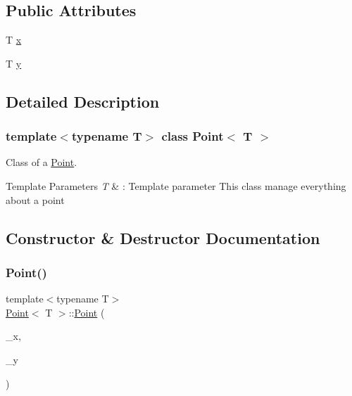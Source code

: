 \subsection*{Public Attributes}
\begin{DoxyCompactItemize}
\item 
T \hyperlink{classPoint_a401d07562afaf0079121218025e66b76}{x}
\item 
T \hyperlink{classPoint_a65146418a33ebb2cd9acb85cade60ac9}{y}
\end{DoxyCompactItemize}


\subsection{Detailed Description}
\subsubsection*{template$<$typename T$>$\newline
class Point$<$ T $>$}

Class of a \hyperlink{classPoint}{Point}. 


\begin{DoxyTemplParams}{Template Parameters}
{\em T} & \+: Template parameter This class manage everything about a point \\
\hline
\end{DoxyTemplParams}


\subsection{Constructor \& Destructor Documentation}
\mbox{\label{classPoint_a8837d10c14dc15b72e6c0e15159e0e8c}} 
\subsubsection{\texorpdfstring{Point()}{Point()}}
{\footnotesize\ttfamily template$<$typename T$>$ \\
\hyperlink{classPoint}{Point}$<$ T $>$\+::\hyperlink{classPoint}{Point} (\begin{DoxyParamCaption}\item[{const T}]{\+\_\+x,  }\item[{const T}]{\+\_\+y }\end{DoxyParamCaption})\hspace{0.3cm}{\ttfamily [inline]}}



